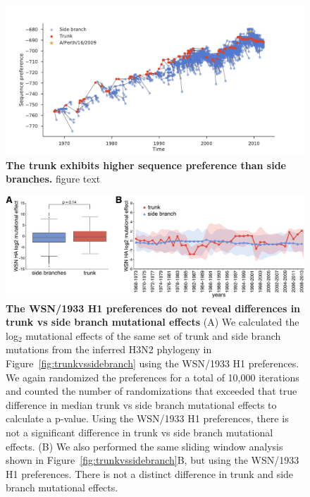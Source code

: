 \documentclass[11pt]{article}
\begin{document}
\begin{figure}
\centerline{\includegraphics[width=\textwidth]{figs/sequence_preference/sequence_preference.pdf}}
\caption{\label{fig:sequence_preference}
{\bf The trunk exhibits higher sequence preference than side branches.}
figure text
}
\end{figure}

\begin{figure}
\centerline{\includegraphics[width=\textwidth]{figs/WSN_trunkvssidebranch/WSN_trunkvssidebranch.pdf}}
\caption{\label{fig:WSN_trunkvssidebranch}
{\bf The WSN/1933 H1 preferences do not reveal differences in trunk vs side branch mutational effects}
(A) We calculated the log$_{2}$ mutational effects of the same set of trunk and side branch mutations from the inferred H3N2 phylogeny in Figure~\ref{fig:trunkvssidebranch} using the WSN/1933 H1 preferences.
We again randomized the preferences for a total of 10,000 iterations and counted the number of randomizations that exceeded that true difference in median trunk vs side branch mutational effects to calculate a p-value.
Using the WSN/1933 H1 preferences, there is not a significant difference in trunk vs side branch mutational effects.
(B) We also performed the same sliding window analysis shown in Figure~\ref{fig:trunkvssidebranch}B, but using the WSN/1933 H1 preferences.
There is not a distinct difference in trunk and side branch mutational effects.
}
\end{figure}
\end{document}
